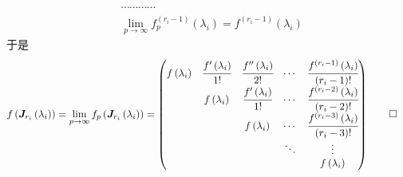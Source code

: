 \begin{formal}
\begin{Proof}
\begin{enumerate}[label={\textup{(\arabic*)}}]
\begin{align*}
                        &\cdots\cdots\cdots\cdots\\
                        &\lim_{p\to\infty}f_p^{\left(r_i-1\right)}\left(\lambda_i\right)=f^{\left(r_i-1\right)}\left(\lambda_i\right)
                    \end{align*}于是\begin{align*}
                        f\left(
                             \bm{J}_{r_i}\left(\lambda_i\right)
                        \right)=\lim_{p\to\infty}f_p\left(
                            \bm{J}_{r_i}\left(\lambda_i\right)
                        \right)&=\begin{pmatrix}
                            f\left(\lambda_i\right)&\cfrac{f'\left(\lambda_i\right)}{1!}&\cfrac{f''\left(\lambda_i\right)}{2!}&\cdots&\cfrac{f^{\left(r_i-1\right)}\left(\lambda_i\right)}{\left(r_i-1\right)!}\\
                            &f\left(\lambda_i\right)&\cfrac{f'\left(\lambda_i\right)}{1!}&\cdots&\cfrac{f^{\left(r_i-2\right)}\left(\lambda_i\right)}{\left(r_i-2\right)!}\\
                            &&f\left(\lambda_i\right)&\cdots&\cfrac{f^{\left(r_i-3\right)}\left(\lambda_i\right)}{\left(r_i-3\right)!}\\
                            &&&\ddots&\vdots\\
                            &&&&f\left(\lambda_i\right)
                        \end{pmatrix}\qedhere
                    \end{align*}
        \end{enumerate}
    \end{Proof}
\end{formal}
